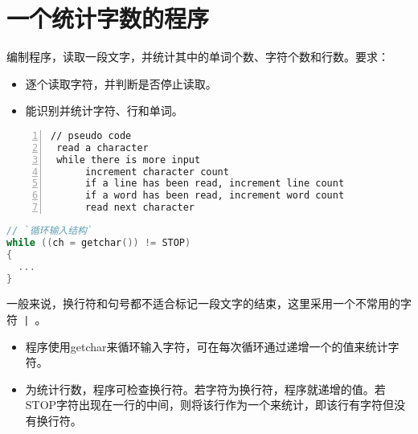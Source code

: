 \section{一个统计字数的程序}
\begin{frame}[fragile]\ft{\secname}
编制程序，读取一段文字，并统计其中的单词个数、字符个数和行数。要求：\\[0.1in]

\begin{itemize}
\item 逐个读取字符，并判断是否停止读取。\\[0.2in]
\item 能识别并统计字符、行和单词。
\end{itemize}
\end{frame}

\begin{frame}[fragile]\ft{\secname}
\begin{lstlisting}[frame=single,numbers=left]
// pseudo code
 read a character
 while there is more input
      increment character count
      if a line has been read, increment line count
      if a word has been read, increment word count
      read next character
\end{lstlisting}
\end{frame}

\begin{frame}[fragile]\ft{\secname}
\begin{lstlisting}[language=c]
// `循环输入结构`
while ((ch = getchar()) != STOP)
{
  ...
}
\end{lstlisting}
\vspace{.05in}\pause \vspace{.05in}

一般来说，换行符和句号都不适合标记一段文字的结束，这里采用一个不常用的字符\lstinline$ | $。
\end{frame}

\begin{frame}[fragile]\ft{\secname}
\begin{itemize}
\item 程序使用getchar来循环输入字符，可在每次循环通过递增一个的值来统计字符。\\[0.15in]
\item 为统计行数，程序可检查换行符。若字符为换行符，程序就递增的值。若STOP字符出现在一行的中间，则将该行作为一个来统计，即该行有字符但没有换行符。
\end{itemize}
\end{frame}

